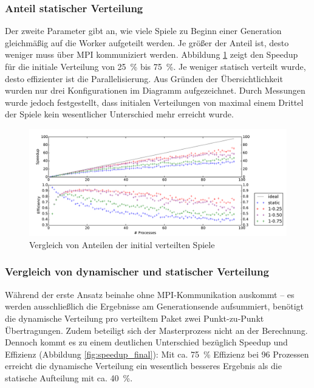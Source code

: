 \subsubsection{Anteil statischer Verteilung}
Der zweite Parameter gibt an, wie viele Spiele zu Beginn einer Generation
gleichmäßig auf die Worker aufgeteilt werden. Je größer der Anteil ist, desto
weniger muss über MPI kommuniziert werden. Abbildung \ref{fig:speedup_initial}
zeigt den Speedup für die initiale Verteilung von \SI{25}{\percent} bis
\SI{75}{\percent}. Je weniger statisch verteilt wurde, desto effizienter ist
die Parallelisierung. Aus Gründen der Übersichtlichkeit wurden nur drei
Konfigurationen im Diagramm aufgezeichnet. Durch Messungen wurde jedoch
festgestellt, dass initialen Verteilungen von maximal einem Drittel der Spiele
kein wesentlicher Unterschied mehr erreicht wurde.

\begin{figure}
    \centering
    \includegraphics[width=\textwidth]
        {content/img/strong_scaling_time_initial.pdf}
    \caption{Vergleich von Anteilen der initial verteilten Spiele}
    \label{fig:speedup_initial}
\end{figure}

\subsubsection{Vergleich von dynamischer und statischer Verteilung}
Während der erste Ansatz beinahe ohne MPI-Kommunikation auskommt -- es werden
ausschließlich die Ergebnisse am Generationsende aufsummiert, benötigt die
dynamische Verteilung pro verteiltem Paket zwei Punkt-zu-Punkt Übertragungen.
Zudem beteiligt sich der Masterprozess nicht an der Berechnung.  Dennoch kommt
es zu einem deutlichen Unterschied bezüglich Speedup und Effizienz (Abbildung
\ref{fig:speedup_final}): Mit ca. \SI{75}{\percent} Effizienz bei 96 Prozessen
erreicht die dynamische Verteilung ein wesentlich besseres Ergebnis als die
statische Aufteilung mit ca. \SI{40}{\percent}.

